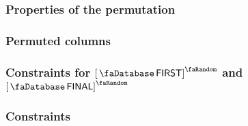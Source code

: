 \subsubsection{Properties of the permutation}                \label{hub: consistencies: account: permutation}        
\subsubsection{Permuted columns}                             \label{hub: consistencies: account: columns to permute} 
\subsubsection{Constraints for $\accFirst$ and $\accFinal$}  \label{hub: consistencies: account: permutation}        
\subsubsection{Constraints}                                  \label{hub: consistencies: account: constraints}        
